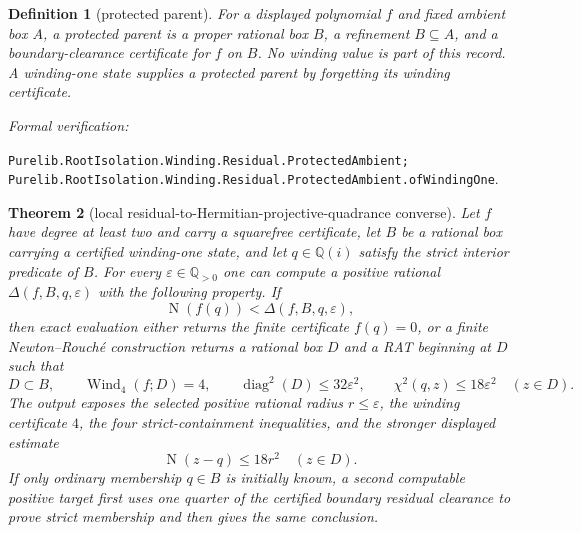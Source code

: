 \documentclass[11pt]{article}
\newtheorem{theorem}{Theorem}[section]
\newtheorem{definition}[theorem]{Definition}
\newcommand{\Qi}{\mathbb{Q}(i)}
\newcommand{\Q}{\mathbb{Q}}
\newcommand{\Norm}[1]{\operatorname{N}\!\left(#1\right)}
\newcommand{\Wind}{\operatorname{Wind}}
\newcommand{\diamq}{\operatorname{diag}^{2}}
\newcommand{\eps}{\varepsilon}
\newcommand{\leanref}[1]{\par\smallskip\noindent
  \emph{Formal verification:}\par\nobreak
  {\raggedright\nolinkurl{#1}.\par}}
\begin{document}
\begin{definition}[protected parent]
\label{def:protected-parent}
For a displayed polynomial $f$ and fixed ambient box $A$, a
\emph{protected parent} is a proper rational box $B$, a refinement
$B\subseteq A$, and a boundary-clearance certificate for $f$ on $B$.
No winding value is part of this record.  A winding-one state supplies a
protected parent by forgetting its winding certificate.
\end{definition}

\leanref{Purelib.RootIsolation.Winding.Residual.ProtectedAmbient;
Purelib.RootIsolation.Winding.Residual.ProtectedAmbient.ofWindingOne}

\begin{theorem}[local residual-to-Hermitian-projective-quadrance converse]
\label{thm:residual-projective-converse}
Let $f$ have degree at least two and carry a squarefree certificate, let $B$
be a rational box carrying a certified winding-one state, and let $q\in\Qi$
satisfy the strict interior predicate of $B$.  For every $\eps\in\Q_{>0}$ one can compute a
positive rational $\Delta(f,B,q,\eps)$ with the following property.  If
\[
                    \Norm{f(q)}<\Delta(f,B,q,\eps),
\]
then exact evaluation either returns the finite certificate $f(q)=0$, or a
finite Newton--Rouché construction returns a rational box $D$ and a RAT
beginning at $D$ such that
\[
 D\subset B,\qquad \Wind_4(f;D)=4,
 \qquad \diamq(D)\le32\eps^2,
 \qquad \chi^2(q,z)\le18\eps^2\quad(z\in D).
\]
The output exposes the selected positive rational radius $r\le\eps$, the
winding certificate $4$, the four strict-containment inequalities,
and the stronger displayed estimate
\[
                   \Norm{z-q}\le18r^2\quad(z\in D).
\]
If only ordinary membership $q\in B$ is initially known, a second computable
positive target first uses one quarter of the certified boundary residual
clearance to prove strict membership and then gives the same conclusion.
\end{theorem}
\end{document}
